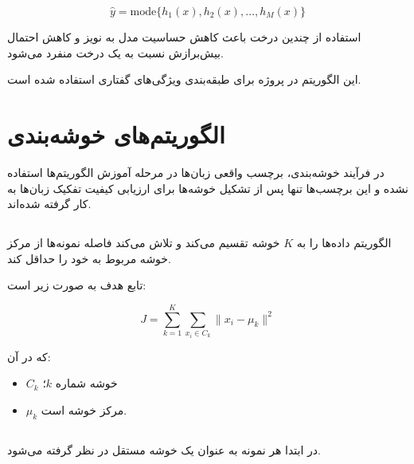 \documentclass[12pt,a4paper,oneside]{report}
\begin{document}
\begin{equation}
\hat{y}
=
\mathrm{mode}
\{
h_1(x),
h_2(x),
\ldots,
h_M(x)
\}
\end{equation}

استفاده از چندین درخت باعث کاهش حساسیت مدل به نویز و کاهش احتمال بیش‌برازش نسبت به یک درخت منفرد می‌شود.

این الگوریتم در پروژه برای طبقه‌بندی ویژگی‌های گفتاری استفاده شده است.


\section{الگوریتم‌های خوشه‌بندی}

در فرآیند خوشه‌بندی، برچسب واقعی زبان‌ها در مرحله آموزش الگوریتم‌ها استفاده نشده و این برچسب‌ها تنها پس از تشکیل خوشه‌ها برای ارزیابی کیفیت تفکیک زبان‌ها به کار گرفته شده‌اند.

\subsection{}

الگوریتم
داده‌ها را به $K$ خوشه تقسیم می‌کند و تلاش می‌کند فاصله نمونه‌ها از مرکز خوشه مربوط به خود را حداقل کند.

تابع هدف به صورت زیر است:

\begin{equation}
J
=
\sum_{k=1}^{K}
\sum_{x_i\in C_k}
\|x_i-\mu_k\|^2
\end{equation}

که در آن:

\begin{itemize}
	\item $C_k$ خوشه شماره $k$؛
	\item $\mu_k$ مرکز خوشه است.
\end{itemize}


\subsection{}

در
ابتدا هر نمونه به عنوان یک خوشه مستقل در نظر گرفته می‌شود.
\end{document}
